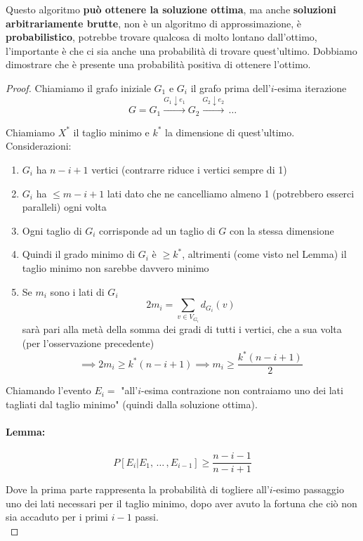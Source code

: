 Questo algoritmo \textbf{può ottenere la soluzione ottima}, ma anche \textbf{soluzioni arbitrariamente brutte}, non è un algoritmo di approssimazione, è \textbf{probabilistico}, potrebbe trovare qualcosa di molto lontano dall'ottimo, l'importante è che ci sia anche una probabilità di trovare quest'ultimo. Dobbiamo dimostrare che è presente una probabilità positiva di ottenere l'ottimo.\\

\begin{proof}
	Chiamiamo il grafo iniziale $G_1$ e $G_i$ il grafo prima dell'$i$-esima iterazione
	$$ G = G_1 \xrightarrow{G_1 \downarrow e_1} G_2 \xrightarrow{G_2 \downarrow e_2} \, \dots $$
	
	Chiamiamo $X^\ast$ il taglio minimo e $k^\ast$ la dimensione di quest'ultimo.\\
	
	Considerazioni:
	\begin{enumerate}
		\item $G_i$ ha $n-i+1$ vertici (contrarre riduce i vertici sempre di 1)
		\item $G_i$ ha $\leq m -i+1$ lati dato che ne cancelliamo almeno 1 (potrebbero esserci paralleli) ogni volta
		\item Ogni taglio di $G_i$ corrisponde ad un taglio di $G$ con la stessa dimensione
		\item Quindi il grado minimo di $G_i$ è $\geq k^\ast$, altrimenti (come visto nel Lemma) il taglio minimo non sarebbe davvero minimo
		\item Se $m_i$ sono i lati di $G_i$
		$$ 2 m_i = \sum_{v \in V_{G_i}} d_{G_i} (v)$$
		sarà pari alla metà della somma dei gradi di tutti i vertici, che a sua volta (per l'osservazione precedente)
		$$ \implies 2m_i \geq k^\ast (n-i+1) \implies m_i \geq \frac{k^\ast (n-i+1)}{2} $$
	\end{enumerate}
	
	Chiamando l'evento $E_i =$ "all'$i$-esima contrazione non contraiamo uno dei lati tagliati dal taglio minimo" (quindi dalla soluzione ottima).\\
	
	\newpage
	
	\paragraph{Lemma: }
	$$P[E_i | E_1, \, \dots \, , E_{i-1}] \geq \frac{n-i-1}{n-i+1}$$
	
	Dove la prima parte rappresenta la probabilità di togliere all'$i$-esimo passaggio uno dei lati necessari per il taglio minimo, dopo aver avuto la fortuna che ciò non sia accaduto per i primi $i-1$ passi.\\
	

\end{proof}
